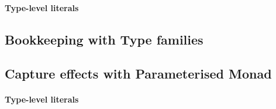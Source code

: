 \documentclass[pldi]{sigplanconf-pldi16}
\begin{document}
\paragraph{Type-level literals}
\subsection{Bookkeeping with Type families}
\subsection{Capture effects with Parameterised Monad}
\paragraph{Type-level literals}


%


%
\end{document}
